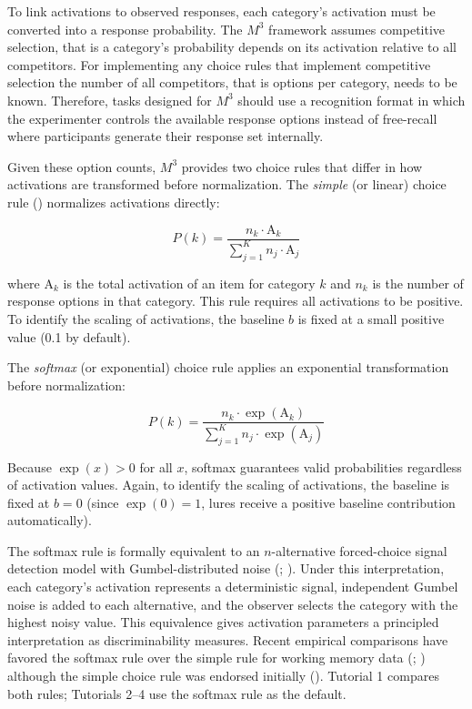 \documentclass[
  man,
  floatsintext,
  longtable,
  nolmodern,
  notxfonts,
  notimes,
  colorlinks=true,linkcolor=blue,citecolor=blue,urlcolor=blue]{apa7}
\begin{document}
To link activations to observed responses, each category's activation
must be converted into a response probability. The \(M^3\) framework
assumes competitive selection, that is a category's probability depends
on its activation relative to all competitors. For implementing any
choice rules that implement competitive selection the number of all
competitors, that is options per category, needs to be known. Therefore,
tasks designed for \(M^3\) should use a recognition format in which the
experimenter controls the available response options instead of
free-recall where participants generate their response set internally.

Given these option counts, \(M^3\) provides two choice rules that differ
in how activations are transformed before normalization. The
\emph{simple} (or linear) choice rule
() normalizes activations
directly:

\[P(k) = \frac{n_k \cdot \text{A}_k}{\sum_{j=1}^{K} n_j \cdot \text{A}_j}\]

where \(\text{A}_k\) is the total activation of an item for category
\(k\) and \(n_k\) is the number of response options in that category.
This rule requires all activations to be positive. To identify the
scaling of activations, the baseline \(b\) is fixed at a small positive
value (0.1 by default).

The \emph{softmax} (or exponential) choice rule applies an exponential
transformation before normalization:

\[P(k) = \frac{n_k \cdot \exp(\text{A}_k)}{\sum_{j=1}^{K} n_j \cdot \exp(\text{A}_j)}\]

Because \(\exp(x) > 0\) for all \(x\), softmax guarantees valid
probabilities regardless of activation values. Again, to identify the
scaling of activations, the baseline is fixed at \(b = 0\) (since
\(\exp(0) = 1\), lures receive a positive baseline contribution
automatically).

The softmax rule is formally equivalent to an \(n\)-alternative
forced-choice signal detection model with Gumbel-distributed noise
(;
). Under this
interpretation, each category's activation represents a deterministic
signal, independent Gumbel noise is added to each alternative, and the
observer selects the category with the highest noisy value. This
equivalence gives activation parameters a principled interpretation as
discriminability measures. Recent empirical comparisons have favored the
softmax rule over the simple rule for working memory data
(;
) although the
simple choice rule was endorsed initially
().
Tutorial 1 compares both rules; Tutorials 2--4 use the softmax rule as
the default.
\end{document}
